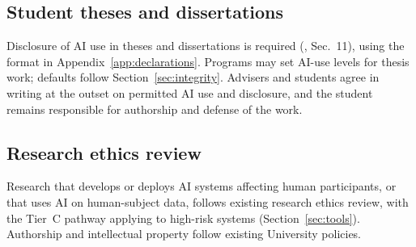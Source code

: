 \subsection{Student theses and dissertations}
Disclosure of AI use in theses and dissertations is required (\cmo{}, Sec.~11), using the format in Appendix~\ref{app:declarations}. Programs may set AI-use levels for thesis work; defaults follow Section~\ref{sec:integrity}. Advisers and students agree in writing at the outset on permitted AI use and disclosure, and the student remains responsible for authorship and defense of the work.

\subsection{Research ethics review}
Research that develops or deploys AI systems affecting human participants, or that uses AI on human-subject data, follows existing research ethics review, with the Tier~C pathway applying to high-risk systems (Section~\ref{sec:tools}). Authorship and intellectual property follow existing University policies.
